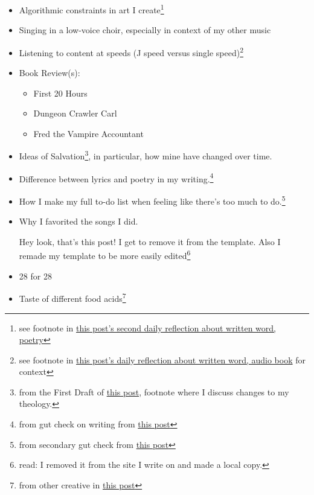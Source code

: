 \documentclass[12pt]{article}
\renewcommand{\,}{\textsuperscript{,}}
\begin{document}
\begin{itemize}
I wrote two drafts of it, one focused on the feeling of losing my mom and one on the idea of letting go of the attachments I have that don't serve me.   
Both are from July 2026.  
 \item Algorithmic constraints in art I create\footnote{see footnote in \href{reflection-june-2026}{this post's second daily reflection about written word, poetry}}  
 \item Singing in a low-voice choir, especially in context of my other music  
 \item Listening to content at speeds (J speed versus single speed)\footnote{see footnote in \href{reflection-2}{this post's daily reflection about written word, audio book} for context}  
 \item Book Review(s):  
 \begin{itemize}  
 \item First 20 Hours  
 \item Dungeon Crawler Carl  
 \item Fred the Vampire Accountant  
 \end{itemize}  
 \item Ideas of Salvation\footnote{from the First Draft of \href{reflection-2}{this post}, footnote where I discuss changes to my theology.}, in particular, how mine have changed over time.  
 \item Difference between lyrics and poetry in my writing.\footnote{from gut check on writing from \href{daily-reflection-2026-08-03}{this post}}  
 \item How I make my full to-do list when feeling like there's too much to do.\footnote{from secondary gut check from \href{daily-reflection-2026-08-03}{this post}}  
\item Why I favorited the songs I did.

Hey look, that's this post! I get to remove it from the template.  
Also I remade my template to be more easily edited\footnote{read: I removed it from the site I write on and made a local copy.}

\item 28 for 28

\item Taste of different food acids\footnote{from other creative in \href{songs-i-like}{this post}}

\end{itemize}  
\end{document}
